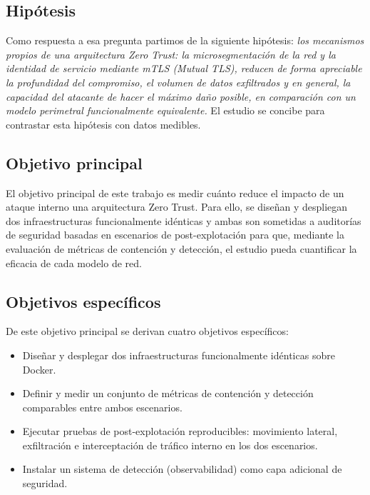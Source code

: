 \documentclass[11pt,spanish,listoffigures,listoftables]{tfgetsinf}
\begin{document}
        \subsection{Hipótesis}
        Como respuesta a esa pregunta partimos de la siguiente hipótesis: \emph{los mecanismos propios de una arquitectura Zero Trust: la microsegmentación de la red y la identidad de servicio mediante mTLS (Mutual TLS), reducen de forma apreciable la profundidad del compromiso, el volumen de datos exfiltrados y en general, la capacidad del atacante de hacer el máximo daño posible, en comparación con un modelo perimetral funcionalmente equivalente.} El estudio se concibe para contrastar esta hipótesis con datos medibles.

        \subsection{Objetivo principal}
        El objetivo principal de este trabajo es medir cuánto reduce el impacto de un ataque interno una arquitectura Zero Trust. Para ello, se diseñan y despliegan dos infraestructuras funcionalmente idénticas y ambas son sometidas a auditorías de seguridad basadas en escenarios de post-explotación para que, mediante la evaluación de métricas de contención y detección, el estudio pueda cuantificar la eficacia de cada modelo de red.

        \subsection{Objetivos específicos}
        De este objetivo principal se derivan cuatro objetivos específicos:
        \begin{itemize}
            \item Diseñar y desplegar dos infraestructuras funcionalmente idénticas sobre Docker.
            \item Definir y medir un conjunto de métricas de contención y detección comparables entre ambos escenarios.
            \item Ejecutar pruebas de post-explotación reproducibles: movimiento lateral, exfiltración e interceptación de tráfico interno en los dos escenarios.
            \item Instalar un sistema de detección (observabilidad) como capa adicional de seguridad.
        \end{itemize}
\end{document}
